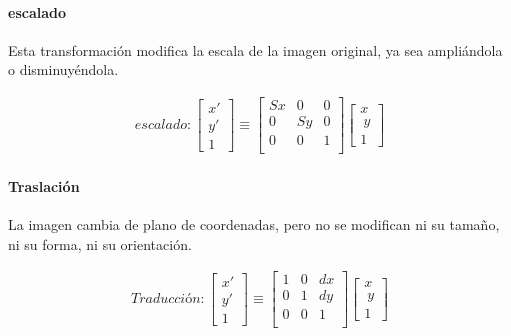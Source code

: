 \paragraph{escalado} 

Esta transformación modifica la escala de la imagen original, ya sea ampliándola o disminuyéndola.



\begin{gather}
	escalado:
	\begin{bmatrix} x' \\ y' \\ 1 \end{bmatrix}
	\equiv
	 \begin{bmatrix}
	  Sx & 0 & 0 \\
	  0 & Sy & 0 \\
	  0 & 0 & 1 \\
	  \end{bmatrix}
	  \begin{bmatrix} x \\\ y \\ 1 \end{bmatrix}
\end{gather}

\paragraph{Traslación}

La imagen cambia de plano de coordenadas, pero no se modifican ni su tamaño, ni su forma, ni su orientación.


\begin{gather}
	Traducción:
	\begin{bmatrix} x' \\ y' \\ 1 \end{bmatrix}
	\equiv
	 \begin{bmatrix}
	  1 & 0 & dx \\
	  0 & 1 & dy \\
	  0 & 0 & 1 \\
	  \end{bmatrix}
	  \begin{bmatrix} x \\\ y \\ 1 \end{bmatrix}
\end{gather}

